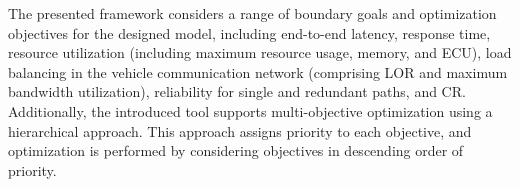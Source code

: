         
        
        
        The presented framework considers a range of boundary goals and optimization objectives for the designed model, including end-to-end latency, response time, resource utilization (including maximum resource usage, memory, and ECU), load balancing in the vehicle communication network (comprising LOR and maximum bandwidth utilization), reliability for single and redundant paths, and CR. Additionally, the introduced tool supports multi-objective optimization using a hierarchical approach. This approach assigns priority to each objective, and optimization is performed by considering objectives in descending order of priority.
        
        
         
